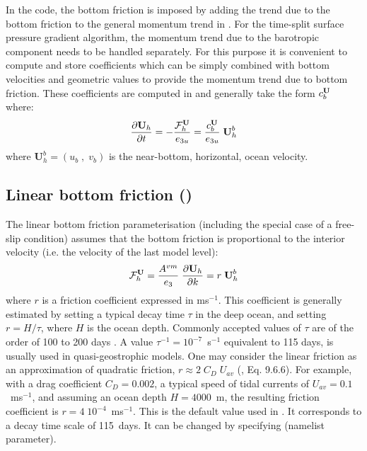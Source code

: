 \documentclass[../tex_main/NEMO_manual]{subfiles}
\begin{document}
In the code, the bottom friction is imposed by adding the trend due to the bottom 
friction to the general momentum trend in . For the time-split surface 
pressure gradient algorithm, the momentum trend due to the barotropic component 
needs to be handled separately. For this purpose it is convenient to compute and 
store coefficients which can be simply combined with bottom velocities and geometric 
values to provide the momentum trend due to bottom friction. 
These coefficients are computed in  and generally take the form 
$c_b^{\textbf U}$ where:
\begin{equation} \label{eq:zdfbfr_bdef}
\frac{\partial {\textbf U_h}}{\partial t} = 
  - \frac{{\cal F}^{\textbf U}_{h}}{e_{3u}} = \frac{c_b^{\textbf U}}{e_{3u}} \;{\textbf U}_h^b
\end{equation}
where $\textbf{U}_h^b = (u_b\;,\;v_b)$ is the near-bottom, horizontal, ocean velocity.

\subsection{Linear bottom friction (\protect{})}
\label{subsec:ZDF_bfr_linear}

The linear bottom friction parameterisation (including the special case 
of a free-slip condition) assumes that the bottom friction 
is proportional to the interior velocity (i.e. the velocity of the last 
model level):
\begin{equation} \label{eq:zdfbfr_linear}
{\cal F}_h^\textbf{U} = \frac{A^{vm}}{e_3} \; \frac{\partial \textbf{U}_h}{\partial k} = r \; \textbf{U}_h^b
\end{equation}
where $r$ is a friction coefficient expressed in ms$^{-1}$. 
This coefficient is generally estimated by setting a typical decay time 
$\tau$ in the deep ocean, 
and setting $r = H / \tau$, where $H$ is the ocean depth. Commonly accepted 
values of $\tau$ are of the order of 100 to 200 days \citep{Weatherly_JMR84}. 
A value $\tau^{-1} = 10^{-7}$~s$^{-1}$ equivalent to 115 days, is usually used 
in quasi-geostrophic models. One may consider the linear friction as an 
approximation of quadratic friction, $r \approx 2\;C_D\;U_{av}$ (\citet{Gill1982}, 
Eq. 9.6.6). For example, with a drag coefficient $C_D = 0.002$, a typical speed 
of tidal currents of $U_{av} =0.1$~m\;s$^{-1}$, and assuming an ocean depth 
$H = 4000$~m, the resulting friction coefficient is $r = 4\;10^{-4}$~m\;s$^{-1}$. 
This is the default value used in \NEMO. It corresponds to a decay time scale 
of 115~days. It can be changed by specifying  (namelist parameter).
\end{document}
